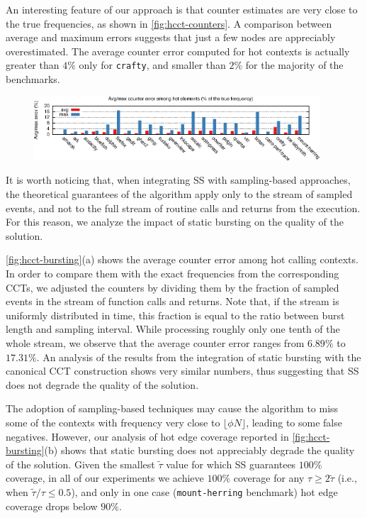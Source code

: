 An interesting feature of our approach is that counter estimates are very close to the true frequencies, as shown in \myfigure\ref{fig:hcct-counters}. A comparison between average and maximum errors suggests that just a few nodes are appreciably overestimated. The average counter error computed for hot contexts is actually greater than $4\%$ only for {\tt crafty}, and smaller than $2\%$ for the majority of the benchmarks.

\ifdefined\noauthorea
\begin{figure}[!ht]
\begin{center}
\includegraphics[width=0.95\textwidth]{figures/hcct-counters/hcct-counters.eps}\\
\caption{\protect}
\end{center}
\end{figure}
\fi

\noindent It is worth noticing that, when integrating SS with sampling-based approaches, the theoretical guarantees of the algorithm apply only to the stream of sampled events, and not to the full stream of routine calls and returns from the execution. For this reason, we analyze the impact of static bursting on the quality of the solution.

\noindent \myfigure\ref{fig:hcct-bursting}(a) shows the average counter error among hot calling contexts. In order to compare them with the exact frequencies from the corresponding CCTs, we adjusted the counters by dividing them by the fraction of sampled events in the stream of function calls and returns. Note that, if the stream is uniformly distributed in time, this fraction is equal to the ratio between burst length and sampling interval. While processing roughly only one tenth of the whole stream, we observe that the average counter error ranges from $6.89\%$ to $17.31\%$. An analysis of the results from the integration of static bursting with the canonical CCT construction shows very similar numbers, thus suggesting that SS does not degrade the quality of the solution.

The adoption of sampling-based techniques may cause the algorithm to miss some of the contexts with frequency very close to $\lfloor\phi N\rfloor$,  leading to some false negatives. However, our analysis of hot edge coverage reported in \myfigure\ref{fig:hcct-bursting}(b) shows that static bursting does not appreciably degrade the quality of the solution. Given the smallest $\widetilde\tau$ value for which SS guarantees $100\%$ coverage, in all of our experiments we achieve $100\%$ coverage for any $\tau\ge2\widetilde\tau$ (i.e., when $\widetilde\tau/\tau\le0.5$), and only in one case ({\tt mount-herring} benchmark) hot edge coverage drops below $90\%$.

